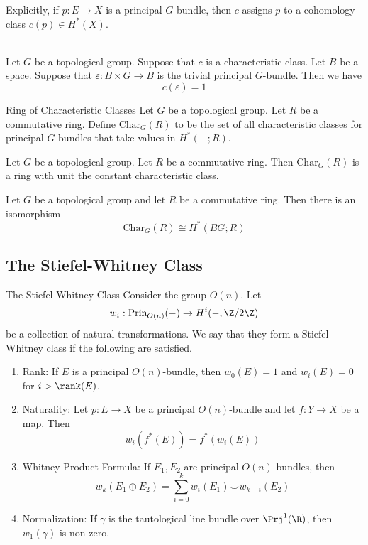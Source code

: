 \documentclass[a4paper]{article}
\begin{document}
Explicitly, if $p:E\to X$ is a principal $G$-bundle, then $c$ assigns $p$ to a cohomology class $c(p)\in H^\ast(X)$. 

\begin{eg}{}{}\\
Let $G$ be a topological group. Suppose that $c$ is a characteristic class. Let $B$ be a space. Suppose that $\varepsilon:B\times G\to B$ is the trivial principal $G$-bundle. Then we have $$c(\varepsilon)=1$$
\end{eg}

\begin{defn}{Ring of Characteristic Classes}{} Let $G$ be a topological group. Let $R$ be a commutative ring. Define $\text{Char}_G(R)$ to be the set of all characteristic classes for principal $G$-bundles that take values in $H^\ast(-;R)$. 
\end{defn}

\begin{prp}{}{} Let $G$ be a topological group. Let $R$ be a commutative ring. Then $\text{Char}_G(R)$ is a ring with unit the constant characteristic class. 
\end{prp}

\begin{thm}{}{} Let $G$ be a topological group and let $R$ be a commutative ring. Then there is an isomorphism $$\text{Char}_G(R)\cong H^\ast(BG;R)$$
\end{thm}

\subsection{The Stiefel-Whitney Class}
\begin{defn}{The Stiefel-Whitney Class}{} Consider the group $O(n)$. Let $$w_i:\text{Prin}_{O(n)}(-)\to H^i(-,\Z/2\Z)$$ be a collection of natural transformations. We say that they form a Stiefel-Whitney class if the following are satisfied. 
\begin{enumerate}
\item Rank: If $E$ is a principal $O(n)$-bundle, then $w_0(E)=1$ and $w_i(E)=0$ for $i>\rank(E)$. 
\item Naturality: Let $p:E\to X$ be a principal $O(n)$-bundle and let $f:Y\to X$ be a map. Then $$w_i(f^\ast(E))=f^\ast(w_i(E))$$
\item Whitney Product Formula: If $E_1,E_2$ are principal $O(n)$-bundles, then $$w_k(E_1\oplus E_2)=\sum_{i=0}^kw_i(E_1)\smile w_{k-i}(E_2)$$
\item Normalization: If $\gamma$ is the tautological line bundle over $\Prj^1(\R)$, then $w_1(\gamma)$ is non-zero. 
\end{enumerate}
\end{defn}
\end{document}
